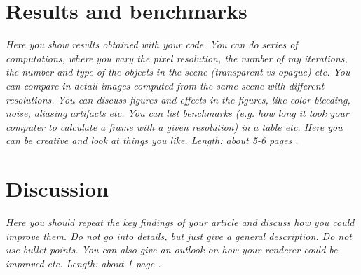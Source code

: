 \documentclass[]{report}   %
\begin{document}
\chapter{Results and benchmarks}
\emph{Here you show results obtained with your code. You can do series of computations, where you vary the pixel resolution, the number of ray iterations, the number and type of the objects in the scene (transparent vs opaque) etc. You can compare in detail images computed from the same scene with different resolutions. You can discuss figures and effects in the figures, like color bleeding, noise, aliasing artifacts etc. You can list benchmarks (e.g. how long it took your computer to calculate a frame with a given resolution) in a table etc. Here you can be creative and look at things you like. 
Length: about 5-6 pages .}


\chapter{Discussion}
\emph{Here you should repeat the key findings of your article and discuss how you could improve them. 
Do not go into details, but just give a general description. 
Do not use bullet points. 
You can also give an outlook on how your renderer could be improved etc. 
Length: about 1 page .}



\end{document}
